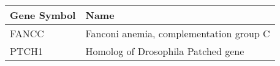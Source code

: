\begin{tabular}{ll}
\toprule
Gene Symbol &                                    Name \\
\midrule
      FANCC & Fanconi anemia, complementation group C \\
      PTCH1 &      Homolog of Drosophila Patched gene \\
\bottomrule
\end{tabular}
